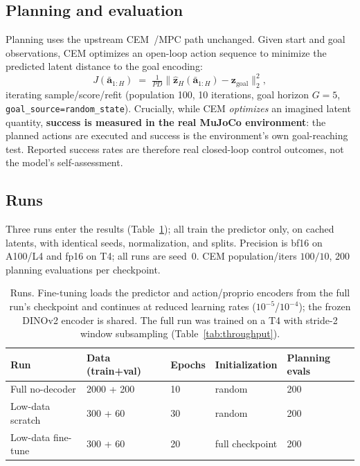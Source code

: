 \documentclass[11pt,a4paper]{article}
\newcommand{\zlat}{\mathbf{z}}
\newcommand{\abar}{\bar{\mathbf{a}}}
\begin{document}
\subsection{Planning and evaluation}
\label{sec:trackii-planning}

Planning uses the upstream CEM~\cite{cem}/MPC path unchanged. Given start and
goal observations, CEM optimizes an open-loop action sequence to minimize the
predicted latent distance to the goal encoding:
\begin{equation}
J(\abar_{1:H}) \;=\; \tfrac{1}{PD}\big\lVert \hat{\zlat}_H(\abar_{1:H}) - \zlat_{\mathrm{goal}} \big\rVert_2^2 ,
\label{eq:trackii-objective}
\end{equation}
iterating sample/score/refit (population 100, 10 iterations, goal horizon
$G{=}5$, \texttt{goal\_source\allowbreak =random\_state}). Crucially, while CEM
\emph{optimizes} an imagined latent quantity, \textbf{success is measured in the
real MuJoCo environment}: the planned actions are executed and success is the
environment's own goal-reaching test. Reported success rates are therefore real
closed-loop control outcomes, not the model's self-assessment.

\subsection{Runs}
\label{sec:trackii-runs}

Three runs enter the results (Table~\ref{tab:trackii-runs}); all train the
predictor only, on cached latents, with identical seeds, normalization, and
splits. Precision is bf16 on A100/L4 and fp16 on T4; all runs are seed~0. CEM
population/iters $100/10$, $200$ planning evaluations per checkpoint.

\begin{table}[h]
\centering\small
\begin{tabular}{@{}lllll@{}}
\toprule
Run & Data (train+val) & Epochs & Initialization & Planning evals \\
\midrule
Full no-decoder    & 2000 + 200 & 10 & random          & 200 \\
Low-data scratch   & 300 + 60   & 30 & random          & 200 \\
Low-data fine-tune & 300 + 60   & 20 & full checkpoint & 200 \\
\bottomrule
\end{tabular}
\caption{Runs. Fine-tuning loads the predictor and action/proprio encoders from
the full run's checkpoint and continues at reduced learning rates
($10^{-5}$/$10^{-4}$); the frozen DINOv2 encoder is shared. The full run was
trained on a T4 with stride-2 window subsampling (Table~\ref{tab:throughput}).}
\label{tab:trackii-runs}
\end{table}
\end{document}

